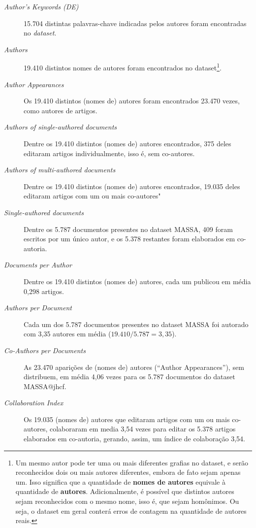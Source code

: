 \begin{description}
    \item [\textit{Author's Keywords (DE)}] 15.704 distintas palavras-chave indicadas pelos autores foram encontradas no \textit{dataset}.
    \item [\textit{Authors}] 19.410 distintos nomes de autores foram encontrados no dataset\footnote{Um mesmo autor pode ter uma ou mais diferentes grafias no dataset, e serão reconhecidos dois ou mais autores diferentes, embora de fato sejam apenas um. Isso significa que a quantidade de \textbf{nomes de autores} equivale à quantidade de \textbf{autores}. Adicionalmente, é possível que distintos autores sejam reconhecidos com o mesmo nome, isso é, que sejam homônimos. Ou seja, o dataset em geral conterá erros de contagem na quantidade de autores reais.}.
    \item [\textit{Author Appearances}] Os 19.410 distintos (nomes de) autores foram encontrados 23.470 vezes, como autores de artigos.
    \item [\textit{Authors of single-authored documents}] Dentre os 19.410 distintos (nomes de) autores encontrados, 375 deles editaram artigos individualmente, isso é, sem co-autores.
    \item [\textit{Authors of multi-authored documents}] Dentre os 19.410 distintos (nomes de) autores encontrados, 19.035 deles editaram artigos com um ou mais co-autores"
    \item [\textit{Single-authored documents}] Dentre os 5.787 documentos presentes no dataset MASSA, 409 foram escritos por um único autor, e os 5.378 restantes foram elaborados em co-autoria.
    \item [\textit{Documents per Author}] Dentre os 19.410 distintos (nomes de) autores, cada um publicou em média 0,298 artigos.
    \item [\textit{Authors per Document}] Cada um dos 5.787 documentos presentes no dataset MASSA foi autorado com 3,35 autores em média ($19.410 / 5.787 = 3,35$).
    \item [\textit{Co-Authors per Documents}] As 23.470 aparições de (nomes de) autores (``Author Appearances''), sem distribuem, em média 4,06 vezes para os 5.787 documentos do dataset MASSA@jhcf.
    \item [\textit{Collaboration Index}] Os 19.035 (nomes de) autores que editaram artigos com um ou mais co-autores, colaboraram em media 3,54 vezes para editar os 5.378 artigos elaborados em co-autoria, gerando, assim, um índice de colaboração 3,54. 
\end{description}

